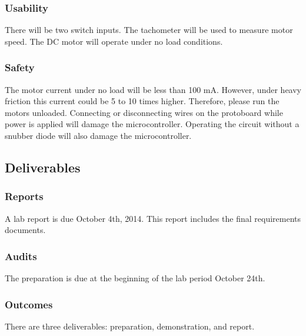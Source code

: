 \documentclass{article}
\begin{document}
		\subsubsection{Usability}
			There will be two switch inputs. The tachometer will be used to measure motor speed. The DC motor will operate under no load conditions.
		\subsubsection{Safety}
			The motor current under no load will be less than 100 mA. However, under heavy friction this current could be 5 to 10 times higher. Therefore, please run the motors unloaded. Connecting or disconnecting wires on the protoboard while power is applied will damage the microcontroller. Operating the circuit without a snubber diode will also damage the microcontroller. 
	\subsection{Deliverables}
	
		\subsubsection{Reports}
			A lab report is due October 4th, 2014. This report includes the final requirements documents.
		\subsubsection{Audits}
			The preparation is due at the beginning of the lab period October 24th.
		\subsubsection{Outcomes}
			There are three deliverables: preparation, demonstration, and report.
 
\end{document}
